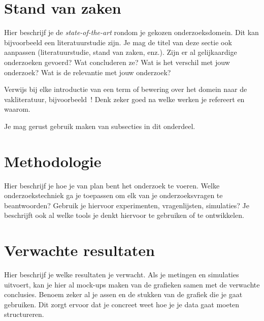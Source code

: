 
\section{Stand van zaken}
\label{sec:stand-van-zaken}




Hier beschrijf je de \emph{state-of-the-art} rondom je gekozen onderzoeksdomein. Dit kan bijvoorbeeld een literatuurstudie zijn. Je mag de titel van deze sectie ook aanpassen (literatuurstudie, stand van zaken, enz.). Zijn er al gelijkaardige onderzoeken gevoerd? Wat concluderen ze? Wat is het verschil met jouw onderzoek? Wat is de relevantie met jouw onderzoek?

Verwijs bij elke introductie van een term of bewering over het domein naar de vakliteratuur, bijvoorbeeld~\textcite{Salomon2006}! Denk zeker goed na welke werken je refereert en waarom.


Je mag gerust gebruik maken van subsecties in dit onderdeel.

\section{Methodologie}
\label{sec:methodologie}

Hier beschrijf je hoe je van plan bent het onderzoek te voeren. Welke onderzoekstechniek ga je toepassen om elk van je onderzoeksvragen te beantwoorden? Gebruik je hiervoor experimenten, vragenlijsten, simulaties? Je beschrijft ook al welke tools je denkt hiervoor te gebruiken of te ontwikkelen.

\section{Verwachte resultaten}
\label{sec:verwachte_resultaten}

Hier beschrijf je welke resultaten je verwacht. Als je metingen en simulaties uitvoert, kan je hier al mock-ups maken van de grafieken samen met de verwachte conclusies. Benoem zeker al je assen en de stukken van de grafiek die je gaat gebruiken. Dit zorgt ervoor dat je concreet weet hoe je je data gaat moeten structureren.

